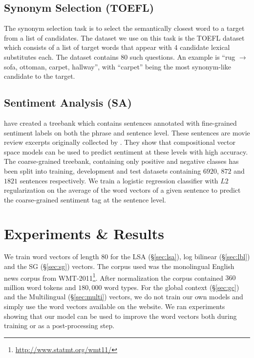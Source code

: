 \documentclass[11pt]{article}
\begin{document}
\subsection{Synonym Selection (TOEFL)}
\label{ref:toefl}

The synonym selection task is to select the semantically closest word to a target from a list of candidates. The dataset we use on this task is the TOEFL dataset \cite{landauer:1997} which consists of a list of target words that appear with 4 candidate lexical substitutes each. The dataset contains 80 such questions. An example is ``rug $\rightarrow$ sofa, ottoman, carpet, hallway'', with ``carpet'' being the most synonym-like candidate to the target.

\subsection{Sentiment Analysis (SA)}
\label{sec:senti}

 have created a treebank which contains sentences
annotated with fine-grained sentiment labels on both the phrase and sentence level.
These sentences are movie review excerpts originally collected by .
They show that compositional vector space models can be used to predict sentiment
at these levels with high accuracy. The coarse-grained treebank, containing only positive and negative 
classes has been split into training, development and test datasets containing $6920$, $872$ and 
$1821$ sentences respectively. We train a logistic regression classifier with $L2$ regularization
on the average of the word 
vectors of a given sentence to predict the coarse-grained sentiment tag at the sentence level.

\section{Experiments \& Results}
\label{sec:expts}

We train word vectors of length $80$ for the LSA (\S\ref{sec:lsa}), log bilinear (\S\ref{sec:lbl}) 
and the SG (\S\ref{sec:sg}) vectors. The corpus used was the monolingual English news corpus from 
WMT-2011\footnote{\url{http://www.statmt.org/wmt11/}}. After normalization the corpus 
contained $360$ million word tokens and $180,000$ word types. For the global context 
(\S\ref{sec:gc}) and the Multilingual (\S\ref{sec:multi}) vectors, we do not train our own models
and simply use the word vectors available on the website.
We ran experiments showing that our model can be used to improve the word vectors both
during training or as a post-processing step.
\end{document}
